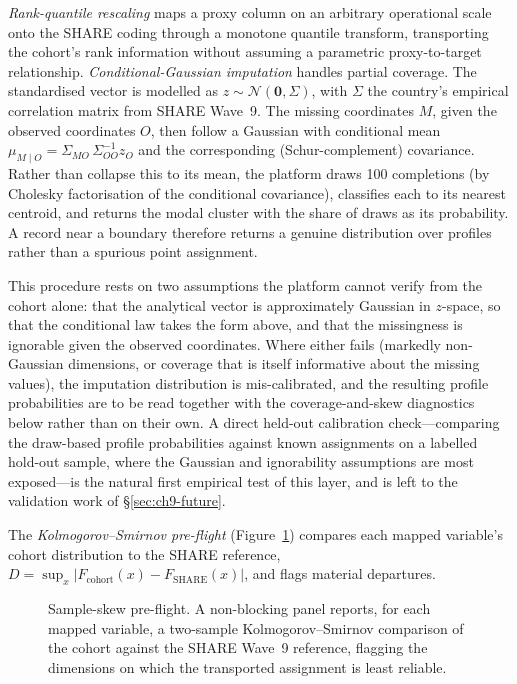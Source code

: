 \emph{Rank-quantile rescaling} maps a proxy column on an arbitrary operational scale onto the SHARE coding through a monotone quantile transform, transporting the cohort's rank information without assuming a parametric proxy-to-target relationship. \emph{Conditional-Gaussian imputation} handles partial coverage. The standardised vector is modelled as $z \sim \mathcal{N}(\mathbf{0}, \Sigma)$, with $\Sigma$ the country's empirical correlation matrix from SHARE Wave~9. The missing coordinates $M$, given the observed coordinates $O$, then follow a Gaussian with conditional mean $\mu_{M\mid O} = \Sigma_{MO}\,\Sigma_{OO}^{-1} z_O$ and the corresponding (Schur-complement) covariance. Rather than collapse this to its mean, the platform draws 100 completions (by Cholesky factorisation of the conditional covariance), classifies each to its nearest centroid, and returns the modal cluster with the share of draws as its probability. A record near a boundary therefore returns a genuine distribution over profiles rather than a spurious point assignment.

This procedure rests on two assumptions the platform cannot verify from the cohort alone: that the analytical vector is approximately Gaussian in $z$-space, so that the conditional law takes the form above, and that the missingness is ignorable given the observed coordinates. Where either fails (markedly non-Gaussian dimensions, or coverage that is itself informative about the missing values), the imputation distribution is mis-calibrated, and the resulting profile probabilities are to be read together with the coverage-and-skew diagnostics below rather than on their own. A direct held-out calibration check---comparing the draw-based profile probabilities against known assignments on a labelled hold-out sample, where the Gaussian and ignorability assumptions are most exposed---is the natural first empirical test of this layer, and is left to the validation work of \S\ref{sec:ch9-future}.

The \emph{Kolmogorov--Smirnov pre-flight} (Figure~\ref{fig:atlas-ks}) compares each mapped variable's cohort distribution to the SHARE reference, $D = \sup_x |F_{\text{cohort}}(x) - F_{\text{SHARE}}(x)|$, and flags material departures.

\begin{figure}[H]
  \centering
  \caption[Italian Silver Atlas, sample-skew pre-flight]{Sample-skew pre-flight. A non-blocking panel reports, for each mapped variable, a two-sample Kolmogorov--Smirnov comparison of the cohort against the SHARE Wave~9 reference, flagging the dimensions on which the transported assignment is least reliable.}
  \label{fig:atlas-ks}
\end{figure}

